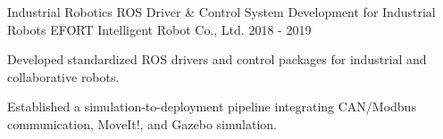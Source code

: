 \begin{cventries}
  \cventry
    {Industrial Robotics}
    {ROS Driver \& Control System Development for Industrial Robots}
    {EFORT Intelligent Robot Co., Ltd.}
    {2018 - 2019}
    {
      \begin{cvitems}
        \item {Developed standardized ROS drivers and control packages for industrial and collaborative robots.}
        \item {Established a simulation-to-deployment pipeline integrating CAN/Modbus communication, MoveIt!, and Gazebo simulation.}
      \end{cvitems}
    }

\end{cventries}

